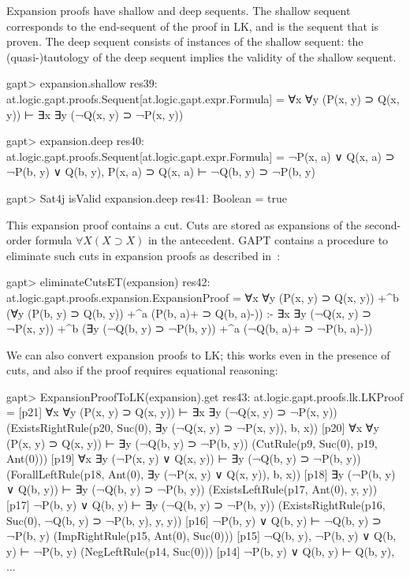 \documentclass[a4paper,11pt]{article}
\newcommand{\impl}{\supset} %
\begin{document}
Expansion proofs have shallow and deep sequents.  The shallow sequent
corresponds to the end-sequent of the proof in LK, and is the sequent that is
proven.  The deep sequent consists of instances of the shallow sequent: the
(quasi-)tautology of the deep sequent implies the validity of the shallow
sequent.
\begin{clilisting}
gapt> expansion.shallow
res39: at.logic.gapt.proofs.Sequent[at.logic.gapt.expr.Formula] = ∀x ∀y (P(x, y) ⊃ Q(x, y)) ⊢ ∃x ∃y (¬Q(x, y) ⊃ ¬P(x, y))

gapt> expansion.deep
res40: at.logic.gapt.proofs.Sequent[at.logic.gapt.expr.Formula] = ¬P(x, a) ∨ Q(x, a) ⊃ ¬P(b, y) ∨ Q(b, y), P(x, a) ⊃ Q(x, a) ⊢ ¬Q(b, y) ⊃ ¬P(b, y)

gapt> Sat4j isValid expansion.deep
res41: Boolean = true

\end{clilisting}

This expansion proof contains a cut.  Cuts are stored as expansions of the
second-order formula $\forall X (X \impl X)$ in the antecedent.  GAPT contains
a procedure to eliminate such cuts in expansion proofs as described
in~\cite{Hetzl2013Expansion}:
\begin{clilisting}
gapt> eliminateCutsET(expansion)
res42: at.logic.gapt.proofs.expansion.ExpansionProof =
∀x ∀y (P(x, y) ⊃ Q(x, y))
  +^{b} (∀y (P(b, y) ⊃ Q(b, y)) +^{a} (P(b, a)+ ⊃ Q(b, a)-))
:-
∃x ∃y (¬Q(x, y) ⊃ ¬P(x, y))
  +^{b} (∃y (¬Q(b, y) ⊃ ¬P(b, y)) +^{a} (¬Q(b, a)+ ⊃ ¬P(b, a)-))

\end{clilisting}

We can also convert expansion proofs to LK; this works even in the presence of
cuts, and also if the proof requires equational reasoning:
\begin{clilisting}
gapt> ExpansionProofToLK(expansion).get
res43: at.logic.gapt.proofs.lk.LKProof =
[p21] ∀x ∀y (P(x, y) ⊃ Q(x, y)) ⊢ ∃x ∃y (¬Q(x, y) ⊃ ¬P(x, y))    (ExistsRightRule(p20, Suc(0), ∃y (¬Q(x, y) ⊃ ¬P(x, y)), b, x))
[p20] ∀x ∀y (P(x, y) ⊃ Q(x, y)) ⊢ ∃y (¬Q(b, y) ⊃ ¬P(b, y))    (CutRule(p9, Suc(0), p19, Ant(0)))
[p19] ∀x ∃y (¬P(x, y) ∨ Q(x, y)) ⊢ ∃y (¬Q(b, y) ⊃ ¬P(b, y))    (ForallLeftRule(p18, Ant(0), ∃y (¬P(x, y) ∨ Q(x, y)), b, x))
[p18] ∃y (¬P(b, y) ∨ Q(b, y)) ⊢ ∃y (¬Q(b, y) ⊃ ¬P(b, y))    (ExistsLeftRule(p17, Ant(0), y, y))
[p17] ¬P(b, y) ∨ Q(b, y) ⊢ ∃y (¬Q(b, y) ⊃ ¬P(b, y))    (ExistsRightRule(p16, Suc(0), ¬Q(b, y) ⊃ ¬P(b, y), y, y))
[p16] ¬P(b, y) ∨ Q(b, y) ⊢ ¬Q(b, y) ⊃ ¬P(b, y)    (ImpRightRule(p15, Ant(0), Suc(0)))
[p15] ¬Q(b, y), ¬P(b, y) ∨ Q(b, y) ⊢ ¬P(b, y)    (NegLeftRule(p14, Suc(0)))
[p14] ¬P(b, y) ∨ Q(b, y) ⊢ Q(b, y), ...

\end{clilisting}
\end{document}
